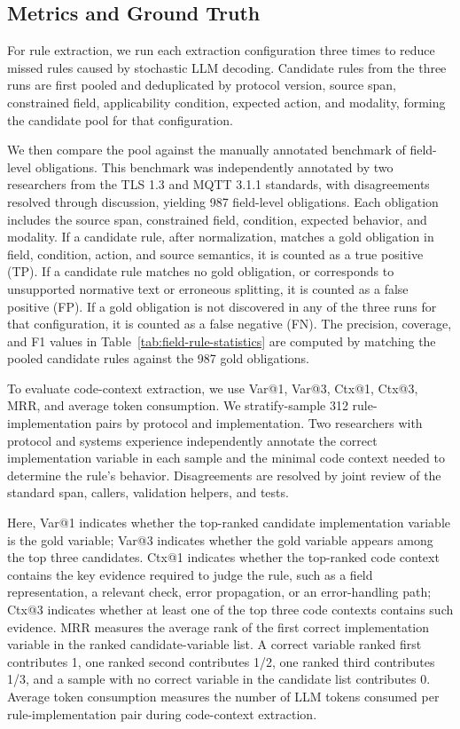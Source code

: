 \subsection{Metrics and Ground Truth}

For rule extraction, we run each extraction configuration three times to reduce
missed rules caused by stochastic LLM decoding. Candidate rules from the
three runs are first pooled and deduplicated by protocol
version, source span, constrained field, applicability condition, expected
action, and modality, forming the candidate pool for that configuration. 

We then compare the pool against the manually annotated benchmark of field-level
obligations. This benchmark was independently annotated by two researchers from
the TLS 1.3 and MQTT 3.1.1 standards, with disagreements resolved through
discussion, yielding 987 field-level obligations. Each obligation includes the
source span, constrained field, condition, expected behavior, and modality. If a
candidate rule, after normalization, matches a gold obligation in field,
condition, action, and source semantics, it is counted as a true positive (TP).
If a candidate rule matches no gold obligation, or corresponds
to unsupported normative text or erroneous splitting, it is counted as a false
positive (FP). If a gold obligation is not discovered in any of the three runs
for that configuration, it is counted as a false negative (FN). The precision,
coverage, and F1 values in Table~\ref{tab:field-rule-statistics} are computed
by matching the pooled candidate rules against the 987 gold obligations.

To evaluate code-context extraction, we use Var@1, Var@3, Ctx@1, Ctx@3, MRR,
and average token consumption. We stratify-sample 312 rule-implementation
pairs by protocol and implementation. Two researchers with protocol and systems
experience independently annotate the correct implementation variable in each
sample and the minimal code context needed to determine the rule's behavior.
Disagreements are resolved by joint review of the standard span, callers,
validation helpers, and tests.

Here, Var@1 indicates whether the top-ranked candidate implementation variable
is the gold variable; Var@3 indicates whether the gold variable appears among
the top three candidates. Ctx@1 indicates whether the top-ranked code context
contains the key evidence required to judge the rule, such as a field
representation, a relevant check, error propagation, or an error-handling
path; Ctx@3 indicates whether at least one of the top three code contexts
contains such evidence. MRR measures the average rank of the first
correct implementation variable in the ranked candidate-variable list. A
correct variable ranked first contributes 1, one ranked second contributes
1/2, one ranked third contributes 1/3, and a sample with no correct variable
in the candidate list contributes 0. Average token
consumption measures the number of LLM tokens consumed per rule-implementation
pair during code-context extraction.

